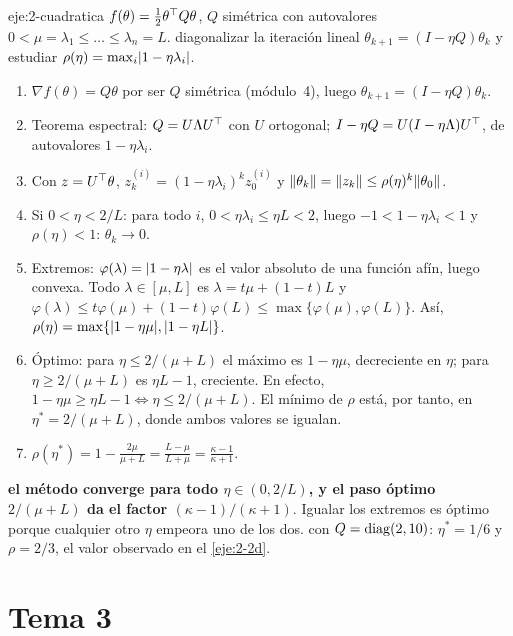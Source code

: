 \begin{solucion}{eje:2-cuadratica}
\datos $f(\theta)=\frac12\theta^{\top} Q\theta$, $Q$ simétrica con autovalores $0<\mu=\lambda_1\le\dots\le\lambda_n=L$.
\planteamiento diagonalizar la iteración lineal $\theta_{k+1}=(I-\eta Q)\theta_k$ y estudiar $\rho(\eta)=\max_i\lvert1-\eta\lambda_i\rvert$.
\pasos
\begin{enumerate}[label=\arabic*.]
  \item $\nabla f(\theta)=Q\theta$ por ser $Q$ simétrica (módulo~4), luego $\theta_{k+1}=(I-\eta Q)\theta_k$.
  \item Teorema espectral: $Q=U\Lambda U^{\top}$ con $U$ ortogonal; $I-\eta Q=U(I-\eta\Lambda)U^{\top}$, de autovalores $1-\eta\lambda_i$.
  \item Con $z=U^{\top}\theta$, $z^{(i)}_k=(1-\eta\lambda_i)^{k}z^{(i)}_0$ y $\lVert\theta_k\rVert=\lVert z_k\rVert\le\rho(\eta)^{k}\lVert\theta_0\rVert$.
  \item Si $0<\eta<2/L$: para todo $i$, $0<\eta\lambda_i\le\eta L<2$, luego $-1<1-\eta\lambda_i<1$ y $\rho(\eta)<1$: $\theta_k\to 0$.
  \item Extremos: $\varphi(\lambda)=\lvert1-\eta\lambda\rvert$ es el valor absoluto de una función afín, luego convexa. Todo $\lambda\in[\mu,L]$ es $\lambda=t\mu+(1-t)L$ y $\varphi(\lambda)\le t\varphi(\mu)+(1-t)\varphi(L)\le\max\{\varphi(\mu),\varphi(L)\}$. Así, $\rho(\eta)=\max\{\lvert1-\eta\mu\rvert,\lvert1-\eta L\rvert\}$.
  \item Óptimo: para $\eta\le 2/(\mu+L)$ el máximo es $1-\eta\mu$, decreciente en $\eta$; para $\eta\ge 2/(\mu+L)$ es $\eta L-1$, creciente. En efecto, $1-\eta\mu\ge\eta L-1\iff\eta\le 2/(\mu+L)$. El mínimo de $\rho$ está, por tanto, en $\eta^{\ast}=2/(\mu+L)$, donde ambos valores se igualan.
  \item $\rho(\eta^{\ast})=1-\frac{2\mu}{\mu+L}=\frac{L-\mu}{L+\mu}=\frac{\kappa-1}{\kappa+1}$.
\end{enumerate}
\resultado \textbf{el método converge para todo $\eta\in(0,2/L)$, y el paso óptimo $2/(\mu+L)$ da el factor $(\kappa-1)/(\kappa+1)$}. Igualar los extremos es óptimo porque cualquier otro $\eta$ empeora uno de los dos.
\comprobacion con $Q=\operatorname{diag}(2,10)$: $\eta^{\ast}=1/6$ y $\rho=2/3$, el valor observado en el \cref{eje:2-2d}.
\end{solucion}

\section{Tema 3}

